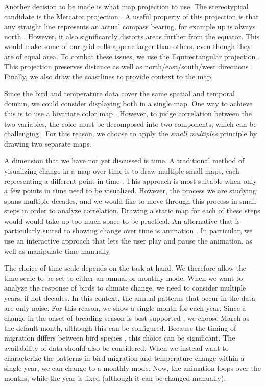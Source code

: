 \documentclass[journal]{vgtc}                %
\begin{document}
Another decision to be made is what map projection to use. The stereotypical candidate is the Mercator projection \cite{monmonier2010mercator}. A useful property of this projection is that any straight line represents an actual compass bearing, for example up is always north \cite{kennedy2000projections}. However, it also significantly distorts areas further from the equator. This would make some of our grid cells appear larger than others, even though they are of equal area. To combat these issues, we use the Equirectangular projection \cite{miller1949equi}. This projection preserves distance as well as north/east/south/west directions \cite{kennedy2000projections}. Finally, we also draw the coastlines to provide context to the map.

Since the bird and temperature data cover the same spatial and temporal domain, we could consider displaying both in a single map. One way to achieve this is to use a bivariate color map \cite{brewer99color,rheingans2000task}. However, to judge correlation between the two variables, the color must be decomposed into two components, which can be challenging \cite{rheingans2000task}. For this reason, we choose to apply the \emph{small multiples} principle \cite{munzner2014visualization} by drawing two separate maps.

A dimension that we have not yet discussed is time. A traditional method of visualizing change in a map over time is to draw multiple small maps, each representing a different point in time \cite{bertin1983semiology}. This approach is most suitable when only a few points in time need to be visualized. However, the process we are studying spans multiple decades, and we would like to move through this process in small steps in order to analyze correlation. Drawing a static map for each of these steps would would take up too much space to be practical. An alternative that is particularly suited to showing change over time is animation \cite{peterson1995interactive}. In particular, we use an interactive approach that lets the user play and pause the animation, as well as manipulate time manually.

The choice of time scale depends on the task at hand. We therefore allow the time scale to be set to either an annual or monthly mode. When we want to analyze the response of birds to climate change, we need to consider multiple years, if not decades. In this context, the annual patterns that occur in the data are only noise. For this reason, we show a single month for each year. Since a change in the onset of breading season is best supported \cite{marra2005influence,cotton2003avian,jenni2003timing}, we choose March as the default month, although this can be configured. Because the timing of migration differs between bird species \cite{jenni2003timing}, this choice can be significant. The availability of data should also be considered. When we instead want to characterize the patterns in bird migration and temperature change within a single year, we can change to a monthly mode. Now, the animation loops over the months, while the year is fixed (although it can be changed manually).
\end{document}
